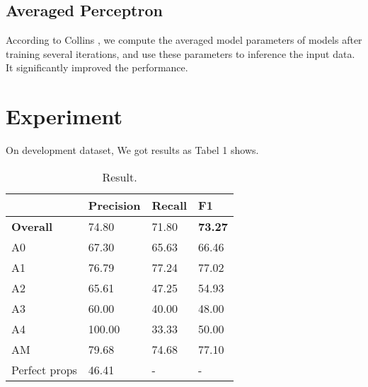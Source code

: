 \documentclass[11pt,a4paper]{article}
\begin{document}
\subsection{Averaged Perceptron}
According to Collins \cite{collins2002discriminative}, we compute the 
averaged model parameters of models after training several iterations,
and use these parameters to inference the input data. It significantly 
improved the performance.

\section{Experiment}

On development dataset, We got results as Tabel 1 shows.
\begin{table}[t!]
  \begin{center}
  \begin{tabular}{|l|l|l|l|}
  \hline & \bf Precision & \bf Recall & \bf F1 \\ \hline
  \bf Overall  &  74.80 &  71.80 &  \bf 73.27 \\
          A0   &   67.30 &  65.63 &  66.46 \\
          A1   &   76.79 &  77.24 &  77.02 \\
          A2   &   65.61 &  47.25 &  54.93 \\
          A3   &   60.00 &  40.00 &  48.00 \\
          A4   &   100.00 &  33.33 &  50.00 \\
          AM   &   79.68 &  74.68 &  77.10 \\
           Perfect props &  46.41 & - & - \\
  \hline
  \end{tabular}
  \end{center}
  \caption{\label{result} Result. }
  \end{table}


%
%


\end{document}
